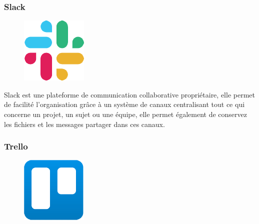 \subsubsection*{Slack}
    \begin{figure}
        \vspace{-22pt}
        \begin{center}
            \includegraphics[scale=0.36]{images/logo/slack.png}
            \label{fig62}
        \end{center}
        \vspace{-20pt}
        \vspace{-10pt}
    \end{figure}
Slack est une  plateforme de communication collaborative propriétaire, elle 
permet de facilité l’organisation grâce à un système de canaux centralisant 
tout ce qui concerne un projet, un sujet ou une équipe, elle permet également 
de conservez les fichiers et les messages partager dans ces canaux\cite{37}. 

\clearpage
        
\subsubsection*{Trello}
    \begin{figure}
        \vspace{-22pt}
        \begin{center}
            \includegraphics[scale=0.36]{images/logo/trello.png}
            \label{fig63}
        \end{center}
        \vspace{-20pt}
        \vspace{-10pt}
    \end{figure}


